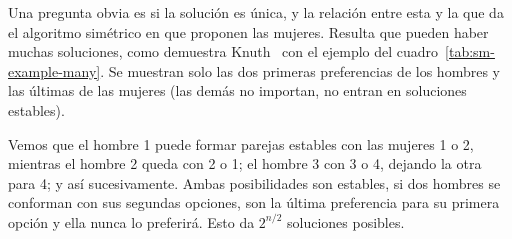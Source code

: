   Una pregunta obvia es si la solución es única,
  y la relación entre esta
  y la que da el algoritmo simétrico en que proponen las mujeres.
  Resulta que pueden haber muchas soluciones,
  como demuestra Knuth~%
    \cite{knuth96:_stable_marriage}
  con el ejemplo del cuadro~\ref{tab:sm-example-many}.
  Se muestran solo las dos primeras preferencias de los hombres
  y las últimas de las mujeres
  (las demás no importan,
   no entran en soluciones estables).
  \begin{table}[ht]
    \centering
    \hspace*{5em}
    \caption{Preferencias para muchas soluciones,
             \(n\) par}
    \label{tab:sm-example-many}
  \end{table}
  Vemos que el hombre \num{1} puede formar parejas estables
  con las mujeres \num{1} o \num{2},
  mientras el hombre \num{2} queda con \num{2} o \num{1};
  el hombre \num{3} con \num{3} o \num{4},
  dejando la otra para \num{4};
  y así sucesivamente.
  Ambas posibilidades son estables,
  si dos hombres se conforman con sus segundas opciones,
  son la última preferencia para su primera opción
  y ella nunca lo preferirá.
  Esto da \(2^{n/2}\) soluciones posibles.

